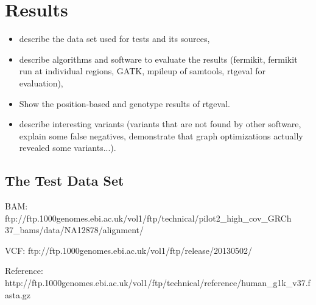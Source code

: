 \chapter{Results}
\label{chap:results}

\begin{itemize}
\item describe the data set used for tests and its sources,
\item describe algorithms and software to evaluate the results (fermikit, fermikit run at individual regions, GATK, mpileup of samtools, rtgeval for evaluation),
\item Show the position-based and genotype results of rtgeval.
\item describe interesting variants (variants that are not found by other software, explain some false negatives, demonstrate that graph optimizations actually revealed some variants...).
\end{itemize}

\section{The Test Data Set}
\label{sec:the-test-data-set}

BAM:
ftp://ftp.1000genomes.ebi.ac.uk/vol1/ftp/technical/pilot2_high_cov_GRCh
37_bams/data/NA12878/alignment/

VCF:
ftp://ftp.1000genomes.ebi.ac.uk/vol1/ftp/release/20130502/

Reference:
http://ftp.1000genomes.ebi.ac.uk/vol1/ftp/technical/reference/human_g1k_v37.fasta.gz



